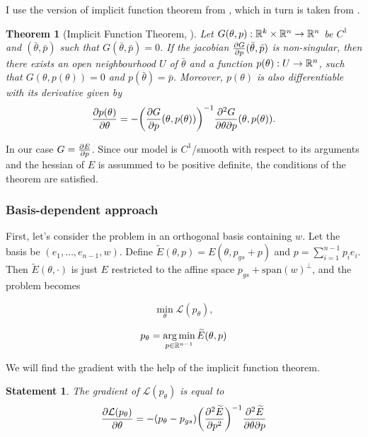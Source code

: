 \documentclass[a4paper,10pt]{report}
\newtheorem{theorem}{Theorem}
\newtheorem{statement}{Statement}
\begin{document}
I use the version of implicit function theorem from \cite{zucchet2022beyond}, which in turn is taken from \cite{dontchev2009implicit}.
\begin{theorem}[Implicit Function Theorem, \cite{zucchet2022beyond} ]
Let $G(\theta, p): \mathbb{R}^k \times \mathbb{R}^n \to \mathbb{R}^n$ be $C^1$ and $(\bar{\theta}, \bar{p})$ such that $G(\bar{\theta},\bar{p})=0$. If the jacobian
$\frac{\partial G}{\partial p}(\bar{\theta},\bar{p})$ is non-singular, then there exists an open neighbourhood $U$ of $\bar{\theta} $ and a function $p(\theta):U \to \mathbb{R}^n$, such that $G(\theta, p(\theta)) = 0$ and $p(\bar{\theta}) = \bar{p}$. Moreover, $p(\theta)$ is also differentiable with
its derivative given by
\begin{equation}
\frac{\partial p(\theta)}{\partial \theta}= - \bigg(\frac{\partial G}{\partial p}(\theta, p(\theta))\bigg)^{-1} \frac{\partial^2 G}{\partial \theta \partial p}(\theta, p(\theta)).
\end{equation}

\end{theorem}
In our case $G = \frac{\partial E}{\partial p}$. Since our model is $C^1$/smooth with respect to its arguments and the hessian of $E$ is assummed to be positive definite, the conditions of the theorem are satisfied.


\subsubsection{Basis-dependent approach}

First, let's consider the problem in an orthogonal basis containing $w$. Let the basis be $(e_1,\ldots, e_{n-1}, w)$. Define $\widetilde{E}(\theta, p) = E(\theta, p_{gs}+ p)$ and $p = \sum_{i=1}^{n-1} p_i e_i$. Then $\widetilde E(\theta, \cdot)$ is just $E$ restricted to the affine space $p_{gs}+\text{span}(w)^\perp$, and the problem becomes

\begin{equation}
  \min_\theta \mathcal{L}(p_\theta),
\end{equation}

\begin{equation}
 p_\theta = \operatorname*{arg\,min}_{p\in \mathbb{R}^{n-1}} \widetilde{E}(\theta, p)
\end{equation}

We will find the gradient with the help of the implicit function theorem.

\begin{statement}
The gradient of $\mathcal{L}(p_\theta)$ is equal to
 \begin{equation}
 \frac{\partial \mathcal{L}(p_\theta)}{\partial \theta} = -(p_\theta - p_{gs}) \bigg(\frac{\partial^2  \widetilde{E}}{\partial p^2}\bigg)^{-1}  \frac{\partial^2  \widetilde{E}}{\partial \theta \partial p}
\end{equation}
\end{statement}
\end{document}
